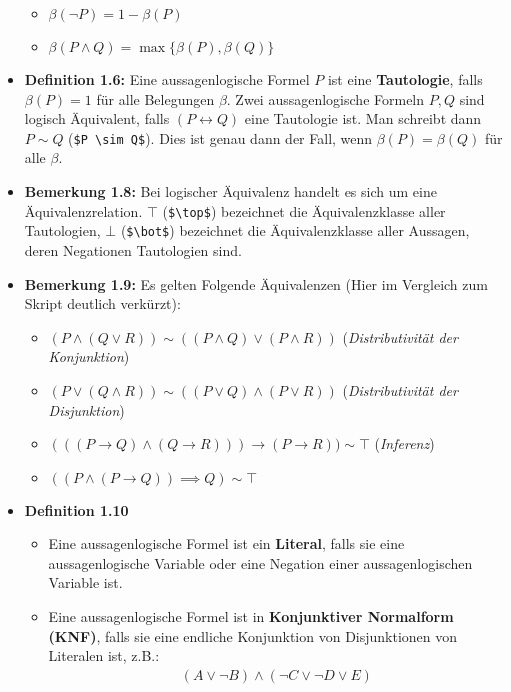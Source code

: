 \documentclass{scrartcl}
\begin{document}
\begin{itemize}
    \begin{itemize}
        \item $\beta(\neg P) = 1 - \beta (P)$
        \item $\beta(P \wedge Q) = \max\{\beta (P), \beta(Q)\}$
    \end{itemize}
    \item \textbf{Definition 1.6:} Eine aussagenlogische Formel $P$ ist eine \textbf{Tautologie}, falls $\beta(P) = 1$ für alle Belegungen $\beta$. Zwei aussagenlogische Formeln $P, Q$ sind logisch Äquivalent, falls $(P \leftrightarrow Q)$ eine Tautologie ist. Man schreibt dann $P \sim Q$ (\texttt{\$P \textbackslash sim Q\$}). Dies ist genau dann der Fall, wenn $\beta(P) = \beta(Q)$ für alle $\beta$.
    \item \textbf{Bemerkung 1.8:} Bei logischer Äquivalenz handelt es sich um eine Äquivalenzrelation. $\top$ (\texttt{\$\textbackslash top\$}) bezeichnet die Äquivalenzklasse aller Tautologien, $\bot$ (\texttt{\$\textbackslash bot\$}) bezeichnet die Äquivalenzklasse aller Aussagen, deren Negationen Tautologien sind.
    \pagebreak
    \item \textbf{Bemerkung 1.9:} Es gelten Folgende Äquivalenzen (Hier im Vergleich zum Skript deutlich verkürzt):
    \begin{itemize}
        \item $(P \wedge (Q \vee R)) \sim ((P \wedge Q) \vee (P \wedge R))$ (\textit{Distributivität der Konjunktion})
        \item $(P \vee (Q \wedge R)) \sim ((P \vee Q) \wedge (P \vee R))$ (\textit{Distributivität der Disjunktion})
        \item $(((P \to Q) \wedge (Q \to R))) \to (P \to R)) \sim \top$ (\textit{Inferenz})
        \item $((P \wedge (P \to Q)) \implies Q) \sim \top$
    \end{itemize}
    \item \textbf{Definition 1.10} 
    \begin{itemize}
        \item Eine aussagenlogische Formel ist ein \textbf{Literal}, falls sie eine aussagenlogische Variable oder eine Negation einer aussagenlogischen Variable ist. 
        \item Eine aussagenlogische Formel ist in \textbf{Konjunktiver Normalform (KNF)}, falls sie eine endliche Konjunktion von Disjunktionen von Literalen ist, z.B.:
        \begin{align*}
            (A \vee \neg B) \wedge (\neg C \vee \neg D \vee E)

\end{align*}
\end{itemize}
\end{itemize}
\end{document}
